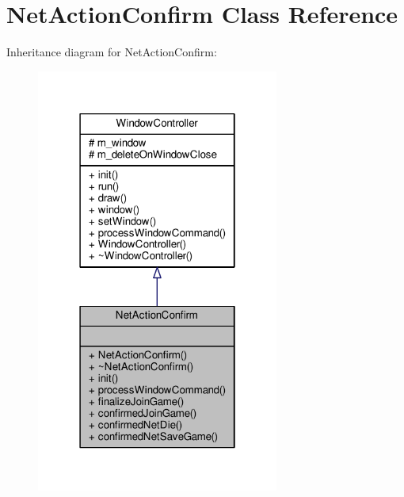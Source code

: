 \hypertarget{classNetActionConfirm}{}\section{Net\+Action\+Confirm Class Reference}
\label{classNetActionConfirm}


Inheritance diagram for Net\+Action\+Confirm\+:
\nopagebreak
\begin{figure}[H]
\begin{center}
\leavevmode
\includegraphics[width=226pt]{d8/d55/classNetActionConfirm__inherit__graph}
\end{center}
\end{figure}


